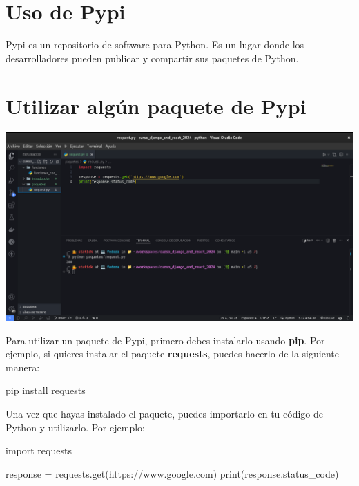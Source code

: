 \documentclass[
  a4paper,
  DIV=11,
  numbers=noendperiod,
  onepage,
  openany]{scrreprt}
\newenvironment{Shaded}{\begin{snugshade}}{\end{snugshade}}
\newcommand{\BuiltInTok}[1]{\textcolor[rgb]{0.00,0.23,0.31}{#1}}
\newcommand{\ExtensionTok}[1]{\textcolor[rgb]{0.00,0.23,0.31}{#1}}
\newcommand{\ImportTok}[1]{\textcolor[rgb]{0.00,0.46,0.62}{#1}}
\newcommand{\NormalTok}[1]{\textcolor[rgb]{0.00,0.23,0.31}{#1}}
\newcommand{\OperatorTok}[1]{\textcolor[rgb]{0.37,0.37,0.37}{#1}}
\newcommand{\StringTok}[1]{\textcolor[rgb]{0.13,0.47,0.30}{#1}}
\begin{document}
\begin{tcolorbox}
\chapter{Uso de Pypi}\label{uso-de-pypi}

Pypi es un repositorio de software para Python. Es un lugar donde los
desarrolladores pueden publicar y compartir sus paquetes de Python.

\chapter{Utilizar algún paquete de
Pypi}\label{utilizar-alguxfan-paquete-de-pypi}

\includegraphics{unidades/unidad4/images/paste-1.png}

Para utilizar un paquete de Pypi, primero debes instalarlo usando
\textbf{pip}. Por ejemplo, si quieres instalar el paquete
\textbf{requests}, puedes hacerlo de la siguiente manera:

\begin{Shaded}
\begin{Highlighting}[]
\ExtensionTok{pip}\NormalTok{ install requests}
\end{Highlighting}
\end{Shaded}

Una vez que hayas instalado el paquete, puedes importarlo en tu código
de Python y utilizarlo. Por ejemplo:

\begin{Shaded}
\begin{Highlighting}[]
\ImportTok{import}\NormalTok{ requests}

\NormalTok{response }\OperatorTok{=}\NormalTok{ requests.get(}\StringTok{\textquotesingle{}https://www.google.com\textquotesingle{}}\NormalTok{)}
\BuiltInTok{print}\NormalTok{(response.status\_code)}
\end{Highlighting}
\end{Shaded}


\end{tcolorbox}
\end{document}
